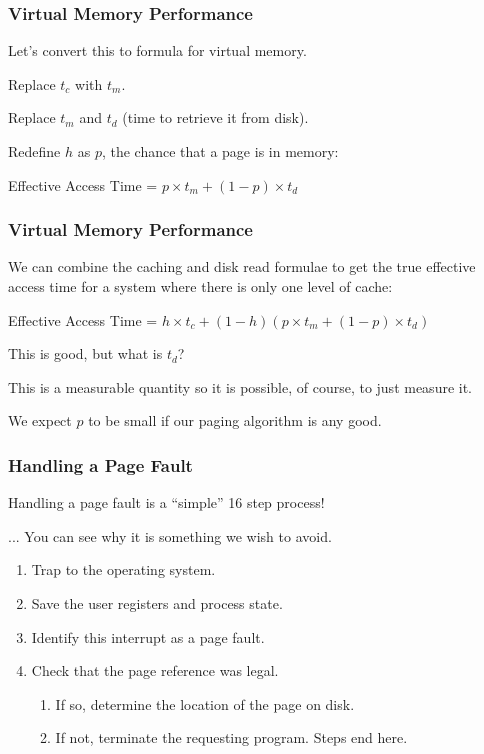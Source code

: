 \begin{frame}
\frametitle{Virtual Memory Performance}

Let's convert this to formula for virtual memory.

Replace $t_{c}$ with $t_{m}$.

Replace $t_{m}$ and $t_{d}$ (time to retrieve it from disk).

Redefine $h$ as $p$, the chance that a page is in memory:

\begin{center}
	Effective Access Time = $ p \times t_{m} + (1 - p) \times t_{d}$
\end{center}

\end{frame}



\begin{frame}
\frametitle{Virtual Memory Performance}

We can combine the caching and disk read formulae to get the true effective access time for a system where there is only one level of cache:

\begin{center}
	Effective Access Time = $ h \times t_{c} + (1 - h) ( p \times t_{m} + (1 - p) \times t_{d})$
\end{center}

This is good, but what is $t_{d}$? 

This is a measurable quantity so it is possible, of course, to just measure it.

We expect $p$ to be small if our paging algorithm is any good.

\end{frame}



\begin{frame}
\frametitle{Handling a Page Fault}

Handling a page fault is a ``simple'' 16 step process!

... You can see why it is something we wish to avoid.

\begin{enumerate}
	\item Trap to the operating system.
	\item Save the user registers and process state.
	\item Identify this interrupt as a page fault.
	\item Check that the page reference was legal. 
	\begin{enumerate}
		\item If so, determine the location of the page on disk.
		\item If not, terminate the requesting program. Steps end here.
	\end{enumerate}
	\setcounter{pf}{\theenumi}
\end{enumerate}

\end{frame}

